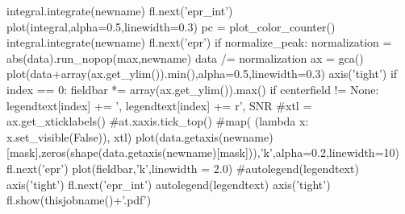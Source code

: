 \begin{tiny}
\begin{python}
   integral.integrate(newname)
   fl.next('epr_int')
   plot(integral,alpha=0.5,linewidth=0.3)
   pc = plot_color_counter()
   integral.integrate(newname)
   fl.next('epr')
   if normalize_peak:
      normalization = abs(data).run_nopop(max,newname)
      data /= normalization
   ax = gca()
   plot(data+array(ax.get_ylim()).min(),alpha=0.5,linewidth=0.3)
   axis('tight')
   if index == 0:
       fieldbar *= array(ax.get_ylim()).max()
   if centerfield != None:
      legendtext[index] += ', %
   legendtext[index] += r', SNR %
#xtl = ax.get_xticklabels()
#at.xaxis.tick_top()
#map( (lambda x: x.set_visible(False)), xtl)
plot(data.getaxis(newname)[mask],zeros(shape(data.getaxis(newname)[mask])),'k',alpha=0.2,linewidth=10)
fl.next('epr')
plot(fieldbar,'k',linewidth = 2.0)
#autolegend(legendtext)
axis('tight')
fl.next('epr_int')
autolegend(legendtext)
axis('tight')
fl.show(thisjobname()+'.pdf')
\end{python}
\end{tiny}




